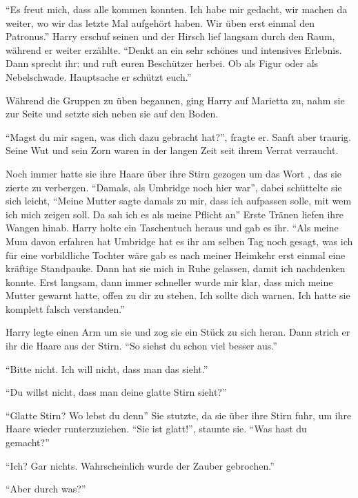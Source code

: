 \enquote{Es freut mich, dass alle kommen konnten. Ich habe mir gedacht, wir machen da weiter, wo wir das letzte Mal aufgehört haben. Wir üben erst einmal den Patronus.} Harry erschuf seinen und der Hirsch lief langsam durch den Raum, während er weiter erzählte. \enquote{Denkt an ein sehr schönes und intensives Erlebnis. Dann sprecht ihr:  und ruft euren Beschützer herbei. Ob als Figur oder als Nebelschwade. Hauptsache er schützt euch.}

Während die Gruppen zu üben begannen, ging Harry auf Marietta zu, nahm sie zur Seite und setzte sich neben sie auf den Boden.

\enquote{Magst du mir sagen, was dich dazu gebracht hat?}, fragte er. Sanft aber traurig. Seine Wut und sein Zorn waren in der langen Zeit seit ihrem Verrat verraucht.

Noch immer hatte sie ihre Haare über ihre Stirn gezogen um das Wort , das sie zierte zu verbergen. \enquote{Damals, als Umbridge noch hier war\abs}, dabei schüttelte sie sich leicht, \enquote{\aabs Meine Mutter sagte damals zu mir, dass ich aufpassen solle, mit wem ich mich zeigen soll. Da sah ich es als meine Pflicht an\abs} Erste Tränen liefen ihre Wangen hinab. Harry holte ein Taschentuch heraus und gab es ihr. \enquote{Als meine Mum davon erfahren hat \gst Umbridge hat es ihr am selben Tag noch gesagt, was ich für eine vorbildliche Tochter wäre \gst gab es nach meiner Heimkehr erst einmal eine kräftige Standpauke. Dann hat sie mich in Ruhe gelassen, damit ich nachdenken konnte. \gst Erst langsam, dann immer schneller wurde mir klar, dass mich meine Mutter gewarnt hatte, offen zu dir zu stehen. Ich sollte dich warnen. Ich hatte sie komplett falsch verstanden.}

Harry legte einen Arm um sie und zog sie ein Stück zu sich heran. Dann strich er ihr die Haare aus der Stirn. \enquote{So siehst du schon viel besser aus.}

\enquote{Bitte nicht. Ich will nicht, dass man das sieht.}

\enquote{Du willst nicht, dass man deine glatte Stirn sieht?}

\enquote{Glatte Stirn? Wo lebst du denn\abs} Sie stutzte, da sie über ihre Stirn fuhr, um ihre Haare wieder runterzuziehen. \enquote{Sie ist glatt!}, staunte sie. \enquote{Was hast du gemacht?}

\enquote{Ich? Gar nichts. Wahrscheinlich wurde der Zauber gebrochen.}

\enquote{Aber durch was?}

